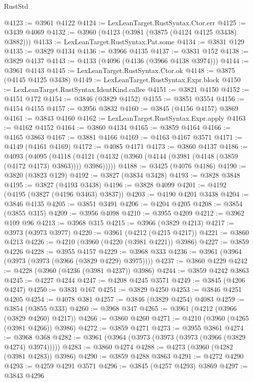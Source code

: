 \begin{lexlean}{RustStd}
\begin{coremodule}
@4123 := @3961 @4122
@4124 := LexLeanTarget.RustSyntax.Ctor.err
@4125 := @3439 @4069
@4132 := @3960 (@4123 (@3981 (@3875 (@4124 @4125 @3438) @3882)))
@4133 := LexLeanTarget.RustSyntax.Pat.some
@4134 := @3831 @129
@4135 := @3829 @4134
@4136 := @3966 @4135
@4137 := @3831 @152
@4138 := @3829 @4137
@4143 := @4133 (@4096 (@4136 (@3966 @4138 @3974)))
@4144 := @3961 @4143
@4145 := LexLeanTarget.RustSyntax.Ctor.ok
@4148 := @3875 (@4145 @4125 @3438)
@4149 := LexLeanTarget.RustSyntax.Expr.block
@4150 := LexLeanTarget.RustSyntax.IdentKind.callee
@4151 := @3821 @4150
@4152 := @4151 @172
@4154 := @3846 (@3829 @4152)
@4155 := @3851 @3554
@4156 := @4154 @4155
@4157 := @3956 @3832
@4160 := @3845 (@4156 @4157) @3869
@4161 := @3843 @4160
@4162 := LexLeanTarget.RustSyntax.Expr.apply
@4163 := @4162 @4152
@4164 := @3860 @4134
@4165 := @3859 @4164
@4166 := @4165 @3863
@4167 := @3881 @4166
@4169 := @4163 @4167 @3571
@4171 := @4149 (@4161 @4169)
@4172 := @4085 @4171
@4173 := @3860 @4137
@4186 := @4093
    (@4095
      (@4118 (@4121 (@4132 (@3960 (@4144 (@3981 (@4148 (@3859 (@4172 @4173) @3863)))) @3986)))))
@4188 := @3425 (@4076 @4186)
@4190 := @3820 (@3823 @129)
@4192 := @3827 (@3834 @3428)
@4193 := @3828 @3848
@4195 := @3827 (@4193 @3438)
@4196 := @3828 @4099
@4201 := @4192 (@4195 (@3827 (@4196 @3463) @3837))
@4203 := @4190 @4201 @3438
@4204 := @3846 @4135
@4205 := @3851 @3491
@4206 := @4204 @4205
@4208 := @3854 (@3855 @315)
@4209 := @3956 @4098
@4210 := @3955 @4209
@4212 := @3962 @109 @96
@4213 := @3968 @315
@4215 := @3966 (@3829 @4213)
@4217 := @3973 (@3973 @3977)
@4220 := @3961 (@4212 (@4215 @4217))
@4221 := @3860 @4213
@4226 := @4210 (@3960 (@4220 (@3981 @4221)) @3986)
@4227 := @3859 @4226
@4228 := @3955 @4157
@4229 := @3968 @333
@4236 := @3961 (@3964 (@3973 (@3973 (@3966 (@3829 @4229) @3975))))
@4237 := @3860 @4229
@4242 := @4228 (@3960 (@4236 (@3981 @4237)) @3986)
@4244 := @3859 @4242 @3863
@4245 := @4227 @4244
@4247 := @4208 @4245 @3571
@4249 := @3845 (@4206 @4247)
@4250 := @3831 @167
@4251 := @3829 @4250
@4253 := @3846 @4251 @4205
@4254 := @4078 @381
@4257 := @3846 (@3829 @4254) @4083
@4259 := @3854 (@3855 @333)
@4260 := @3968 @347
@4265 := @3961 (@4212 (@3966 (@3829 @4260) @4217))
@4266 := @3860 @4260
@4271 := @4210 (@3960 (@4265 (@3981 @4266)) @3986)
@4272 := @3859 @4271
@4273 := @3955 @3861
@4274 := @3968 @368
@4282 := @3961 (@3964 (@3973 (@3973 (@3973 (@3966 (@3829 @4274) @3974)))))
@4283 := @3860 @4274
@4288 := @4273 (@3960 (@4282 (@3981 @4283)) @3986)
@4290 := @3859 @4288 @3863
@4291 := @4272 @4290
@4293 := @4259 @4291 @3571
@4296 := @3845 (@4257 @4293) @3869
@4297 := @3843 @4296

\end{coremodule}
\end{lexlean}
